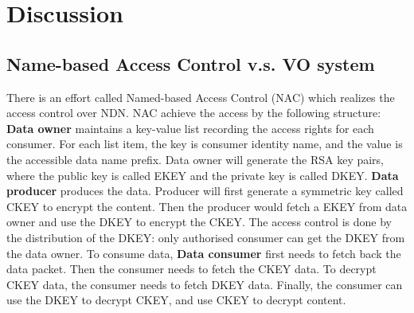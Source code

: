 \section{Discussion}

\subsection{Name-based Access Control v.s. VO system}
There is an effort called Named-based Access Control (NAC) which realizes the access control over NDN.
NAC achieve the access by the following structure:
\textbf{Data owner} maintains a key-value list recording the access rights for each consumer.
For each list item, the key is consumer identity name, and the value is the accessible data name prefix.
Data owner will generate the RSA key pairs, where the public key is called EKEY and the private key is called DKEY.
\textbf{Data producer} produces the data.
Producer will first generate a symmetric key called CKEY to encrypt the content.
Then the producer would fetch a EKEY from data owner and use the DKEY to encrypt the CKEY.
The access control is done by the distribution of the DKEY: only authorised consumer can get the DKEY from the data owner.
To consume data, \textbf{Data consumer} first needs to fetch back the data packet.
Then the consumer needs to fetch the CKEY data.
To decrypt CKEY data, the consumer needs to fetch DKEY data.
Finally, the consumer can use the DKEY to decrypt CKEY, and use CKEY to decrypt content.

